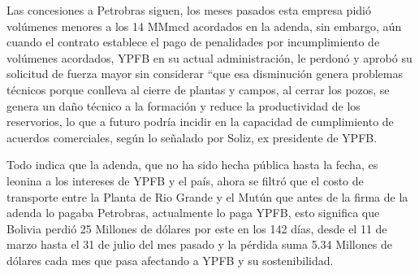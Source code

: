 \documentclass[a4paper, nobind]{templates/ociamthesis}
\begin{document}
Las concesiones a Petrobras siguen, los meses pasados esta empresa pidió volúmenes menores a los 14 MMmcd acordados en la adenda, sin embargo, aún cuando el contrato establece el pago de penalidades por incumplimiento de volúmenes acordados, YPFB en su actual administración, le perdonó y aprobó su solicitud de fuerza mayor sin considerar ``que esa disminución genera problemas técnicos porque conlleva al cierre de plantas y campos, al cerrar los pozos, se genera un daño técnico a la formación y reduce la productividad de los reservorios, lo que a futuro podría incidir en la capacidad de cumplimiento de acuerdos comerciales, según lo señalado por Soliz, ex presidente de YPFB.

Todo indica que la adenda, que no ha sido hecha pública hasta la fecha, es leonina a los intereses de YPFB y el país, ahora se filtró que el costo de transporte entre la Planta de Rio Grande y el Mutún que antes de la firma de la adenda lo pagaba Petrobras, actualmente lo paga YPFB, esto significa que Bolivia perdió 25 Millones de dólares por este en los 142 días, desde el 11 de marzo hasta el 31 de julio del mes pasado y la pérdida suma 5.34 Millones de dólares cada mes que pasa afectando a YPFB y su sostenibilidad.
\end{document}
